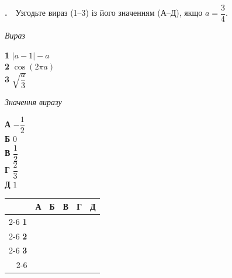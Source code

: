 \documentclass[12pt]{article}
\newcommand{\matchingGrid}{%
    \begingroup
    \renewcommand{\arraystretch}{1.15}
    \setlength{\tabcolsep}{4pt}
    \footnotesize
    \begin{tabular}{r|c|c|c|c|c|}
         \multicolumn{1}{c}{} & \multicolumn{1}{c}{\textbf{А}} & \multicolumn{1}{c}{\textbf{Б}} & \multicolumn{1}{c}{\textbf{В}} & \multicolumn{1}{c}{\textbf{Г}} & \multicolumn{1}{c}{\textbf{Д}} \\ \cline{2-6}
         \textbf{1} & \phantom{X} & \phantom{X} & \phantom{X} & \phantom{X} & \phantom{X} \\ \cline{2-6}
         \textbf{2} & & & & & \\ \cline{2-6}
         \textbf{3} & & & & & \\ \cline{2-6}
    \end{tabular}
    \endgroup
}
\newcounter{zad}
\newcommand{\zadtask}[1]{\stepcounter{zad}\par\vspace{0.3cm}\noindent\textbf{\thezad.}\ \ #1\par\vspace{0.2cm}}
\begin{document}
\zadtask{Узгодьте вираз (1--3) із його значенням (А--Д), якщо $a = \dfrac{3}{4}$.\par
\vspace{0.3cm}
\noindent
\begin{minipage}[t]{0.42\textwidth}
\textit{Вираз}\par\vspace{0.15cm}
\textbf{1} \quad $|a - 1| - a$\\[0.35cm]
\textbf{2} \quad $\cos(2\pi a)$\\[0.35cm]
\textbf{3} \quad $\sqrt{\dfrac{a}{3}}$
\end{minipage}%
\hfill
\begin{minipage}[t]{0.3\textwidth}
\textit{Значення виразу}\par\vspace{0.15cm}
\textbf{А} \quad $-\dfrac{1}{2}$\\[0.2cm]
\textbf{Б} \quad $0$\\[0.15cm]
\textbf{В} \quad $\dfrac{1}{2}$\\[0.2cm]
\textbf{Г} \quad $\dfrac{2}{3}$\\[0.2cm]
\textbf{Д} \quad $1$
\end{minipage}%
\hfill
\begin{minipage}[t]{0.2\textwidth}
\vspace{0.4cm}
\begin{flushright}\matchingGrid\end{flushright}
\end{minipage}}
\end{document}
